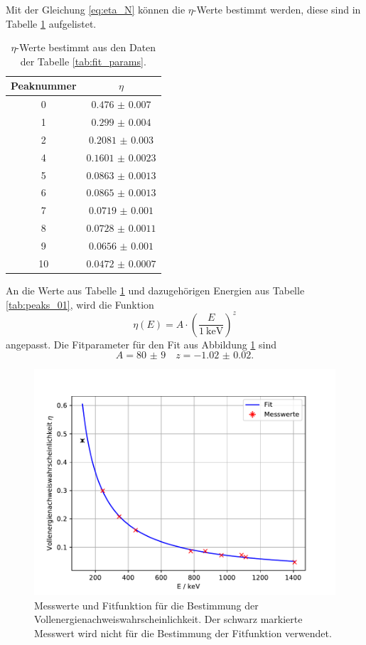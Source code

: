 \FloatBarrier
Mit der Gleichung \eqref{eq:eta_N} können die $\eta$-Werte bestimmt werden, diese sind in Tabelle \ref{tab:eta_Werte} aufgelistet.
\FloatBarrier
\begin{table}
  \centering
  \caption{$\eta$-Werte bestimmt aus den Daten der Tabelle \ref{tab:fit_params}.}
  \label{tab:eta_Werte}
  \begin{tabular}{c c}
    \toprule
    Peaknummer& $\eta$\\
    \midrule
    0   &$\num{0.476(7)}$\\
    1   &$\num{0.299(4)}$\\
    2   &$\num{0.2081(30)}$\\
    4   &$\num{0.1601(23)}$\\
    5   &$\num{0.0863(13)}$\\
    6   &$\num{0.0865(13)}$\\
    7   &$\num{0.0719(10)}$\\
    8   &$\num{0.0728(11)}$\\
    9   &$\num{0.0656(10)}$\\
    10  &$\num{0.0472(7)}$\\
    \bottomrule
  \end{tabular}
\end{table}
An die Werte aus Tabelle \ref{tab:eta_Werte} und dazugehörigen Energien aus Tabelle \ref{tab:peaks_01}, wird die Funktion
\begin{equation*}
  \eta(E) = A\cdot \left(\frac{E}{\SI{1}{\kilo\eV}}\right)^z
\end{equation*}
angepasst. 
Die Fitparameter für den Fit aus Abbildung \ref{fig:Vollenergienachweiswahrscheinlichkeit} sind 
\begin{equation*}
  A = \num{80(9)} \quad z = \num{-1.02(2)}.
\end{equation*}
\begin{figure}
  \centering
  \caption{Messwerte und Fitfunktion für die Bestimmung der Vollenergienachweiswahrscheinlichkeit. Der schwarz markierte Messwert wird nicht für die Bestimmung der Fitfunktion verwendet.}
  \label{fig:Vollenergienachweiswahrscheinlichkeit}
  \includegraphics[width = \textwidth, keepaspectratio]{figure/Vollenergienachweiswahrscheinlichkeit.pdf}
\end{figure}
\FloatBarrier
